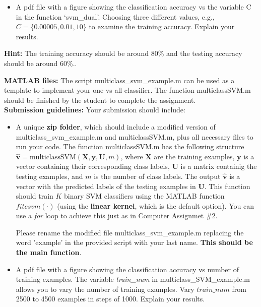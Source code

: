 \documentclass[11pt,oneside,a4paper]{article}
\begin{document}
\begin{enumerate}
\begin{itemize}
  	\item A pdf file with a figure showing the classification accuracy vs the variable C in the function `svm\_dual'. Choosing three different values, e.g., $C = \{0.00005, 0.01, 10\}$ to examine the training accuracy. Explain your results.
  \end{itemize}
  \textbf{Hint:} The training accuracy should be around 80\% and the testing accuracy should be around 60\%.. 


  \textbf{MATLAB files:} The script multiclass\_svm\_example.m can be used as a template to implement your one-vs-all classifier. The function multiclassSVM.m should be finished by the student to complete the assignment.
  \\
  \textbf{Submission guidelines:} Your submission should include:
  \begin{itemize}
  	\item A unique \textbf{zip folder}, which should include a modified version of multiclass\_svm\_example.m and multiclassSVM.m, plus all necessary files to run your code. The function multiclassSVM.m has the following structure $\hat{\textbf{v}}=\text{multiclassSVM}(\textbf{X},\textbf{y},\textbf{U},m)$, where $\textbf{X}$ are the training examples, $\textbf{y}$ is a vector containing their corresponding class labels, $\textbf{U}$ is a matrix containig the testing examples, and $m$ is the number of class labels. The output $\hat{\textbf{v}}$ is a vector with the predicted labels of the testing examples in $\textbf{U}$. This function should train $K$ binary SVM classifiers using the MATLAB function $fitcsvm(\cdot)$ (using the \textbf{linear kernel}, which is the default option). You can use a \textit{for} loop to achieve this just as in Computer Assignmet \#2. 
  	
  	Please rename the modified file multiclass\_svm\_example.m replacing the word 'example' in the provided script with your last name. \textbf{This should be the main function}.
  	
  	\item A pdf file with a figure showing the classification accuracy vs number of training examples. The variable \textit{train\_num} in multiclass\_SVM\_example.m allows you to vary the number of training examples. Vary $train\_num$ from 2500 to 4500 examples in steps of 1000. Explain your results.
  \end{itemize}
\end{enumerate}
%
%
\end{document}
